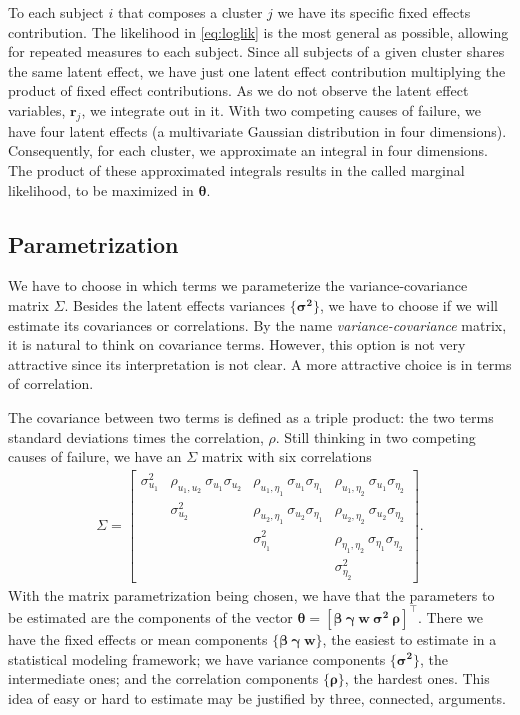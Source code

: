 To each subject \(i\) that composes a cluster \(j\) we have its specific
fixed effects contribution. The likelihood in \autoref{eq:loglik} is the
most general as possible, allowing for repeated measures to each
subject. Since all subjects of a given cluster shares the same latent
effect, we have just one latent effect contribution multiplying the
product of fixed effect contributions. As we do not observe the latent
effect variables, \(\bm{r}_{j}\), we integrate out in it. With two
competing causes of failure, we have four latent effects (a multivariate
Gaussian distribution in four dimensions). Consequently, for each
cluster, we approximate an integral in four dimensions. The product of
these approximated integrals results in the called marginal likelihood,
to be maximized in \(\bm{\theta}\).

\subsection{Parametrization}
\label{cap:parametrization}

We have to choose in which terms we parameterize the variance-covariance
matrix \(\Sigma\). Besides the latent effects variances
\(\{\bm{\sigma^{2}}\}\), we have to choose if we will estimate its
covariances or correlations. By the name \textit{variance-covariance}
matrix, it is natural to think on covariance terms. However, this option
is not very attractive since its interpretation is not clear. A more
attractive choice is in terms of correlation.

The covariance between two terms is defined as a triple product: the two
terms standard deviations times the correlation, \(\rho\). Still
thinking in two competing causes of failure, we have an \(\Sigma\)
matrix with six correlations
\begin{align*}
 \Sigma = \begin{bmatrix}
           \sigma_{u_{1}}^{2}&
           \rho_{u_{1},u_{2}}~\sigma_{u_{1}}\sigma_{u_{2}}&
           \rho_{u_{1},\eta_{1}}~\sigma_{u_{1}}\sigma_{\eta_{1}}&
           \rho_{u_{1},\eta_{2}}~\sigma_{u_{1}}\sigma_{\eta_{2}}\\
           &\sigma_{u_{2}}^{2}&
           \rho_{u_{2},\eta_{1}}~\sigma_{u_{2}}\sigma_{\eta_{1}}&
           \rho_{u_{2},\eta_{2}}~\sigma_{u_{2}}\sigma_{\eta_{2}}\\
           &&\sigma_{\eta_{1}}^{2}&
           \rho_{\eta_{1},\eta_{2}}~\sigma_{\eta_{1}}\sigma_{\eta_{2}}\\
           &&&\sigma_{\eta_{2}}^{2}
          \end{bmatrix}.
\end{align*}
With the matrix parametrization being chosen, we have that the
parameters to be estimated are the components of the vector
\(\bm{\theta} = [\bm{\beta}~ \bm{\gamma}~\bm{w}~\bm{\sigma^{2}}~
\bm{\rho}]^{\top}\). There we have the fixed effects or mean components
\(\{\bm{\beta}~\bm{\gamma}~\bm{w}\}\), the easiest to estimate in a
statistical modeling framework; we have variance components
\(\{\bm{\sigma^{2}}\}\), the intermediate ones; and the correlation
components \(\{\bm{\rho}\}\), the hardest ones. This idea of easy or
hard to estimate may be justified by three, connected, arguments.

